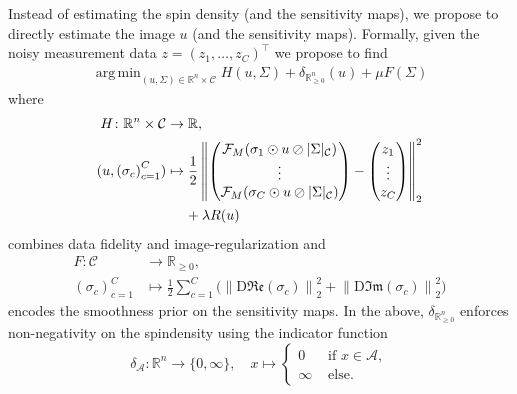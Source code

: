 \documentclass[twocolumn]{article}
\DeclareMathOperator*{\argmin}{arg\,min}
\newcommand{\R}{\mathbb{R}}
\newcommand{\Function}[3]{#1\colon#2\to#3}
\newcommand{\set}[1]{\mathcal{#1}}
\newcommand{\norm}[1]{\left\lVert#1\right\rVert}
\begin{document}
Instead of estimating the spin density (and the sensitivity maps), we propose to directly estimate the image \( u \) (and the sensitivity maps).
Formally, given the noisy measurement data \( z = {(z_1,\dotsc, z_C )}^{\top} \)  we propose to find
\begin{equation}
	\begin{aligned}
		\argmin_{(u, \Sigma) \in \R^n \times \mathcal{C}} H(u, \Sigma) + \delta_{\mathbb{R}_{\geq 0}^n}(u) + \mu F(\Sigma)
	\end{aligned}
	\label{eq:mri problem}
\end{equation}
where
\begin{equation}
	\begin{aligned}
		\Function{H}{\R^n \times \mathcal{C}&}{\R}, \\
		(u, {(\sigma_c)}_{c=1}^C) &\mapsto \frac{1}{2} \norm{%
			\begin{pmatrix}
				\mathcal{F}_M(\sigma_1 \odot u \oslash |\Sigma|_{\mathcal{C}}) \\
				\vdotswithin{%
					\mathcal{F}_M(\sigma_1 \dot u \slash |\Sigma|_{\mathcal{C}})%
				} \\
				\mathcal{F}_M(\sigma_{C} \odot u \oslash |\Sigma|_{\mathcal{C}})
			\end{pmatrix} - \begin{pmatrix}
				z_1 \\ \vdotswithin{y_1} \\ z_C
			\end{pmatrix}%
		}_2^2\\
		&\phantom{\mapsto}\ + \lambda R (u)
	\end{aligned}%
	\label{eq:H}
\end{equation}
combines  data fidelity and image-regularization and 
\begin{equation}
	\begin{aligned}
		\Function{F}{\mathcal{C}&}{\R_{\geq 0}}, \\
		{(\sigma_c)}_{c=1}^C &\mapsto \frac{1}{2}\sum_{c=1}^{C} \big( \norm{\mathrm{D} \mathfrak{Re}(\sigma_c)}_2^2 + \norm{\mathrm{D} \mathfrak{Im}(\sigma_c)}_2^2 \big)
	\end{aligned}
\end{equation}
encodes the smoothness prior on the sensitivity maps.
In the above, \( \delta_{\R^n_{\geq 0}} \) enforces non-negativity on the spin\replaced{ }{-}density using the indicator function
\begin{equation}
	\Function{\delta_{\set{A}}}{\R^n}{\{ 0, \infty \}}, \quad x \mapsto \begin{cases} 0 & \text{ if } x \in \set{A}, \\
	\infty & \text{ else.}\end{cases}
\end{equation}
\end{document}
